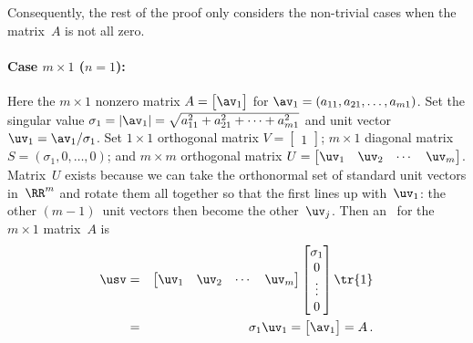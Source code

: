 Consequently, the rest of the proof only considers the non-trivial cases when the matrix~\(A\) is not all zero. 



\paragraph{Case $m\times 1$ ($n=1$):}
Here the \(m\times 1\) nonzero matrix \(A=\begin{bmatrix} \av_1 \end{bmatrix}\) for \(\av_1=(a_{11},a_{21},\ldots,a_{m1})\).
Set the singular value \(\sigma_1=|\av_1|=\sqrt{a_{11}^2+a_{21}^2+\cdots+a_{m1}^2}\) and unit vector \(\uv_1=\av_1/\sigma_1\).
Set \(1\times 1\) orthogonal matrix \(V=\begin{bmatrix} 1 \end{bmatrix}\);
\(m\times 1\) diagonal matrix 
\(S=(\sigma_1,0,\ldots,0)\); and
\(m\times m\) orthogonal matrix \(U=\begin{bmatrix} \uv_1 &\uv_2&\cdots&\uv_m\end{bmatrix}\).
Matrix~\(U\) exists because we can take the orthonormal set of standard unit vectors in~\(\RR^m\) and rotate them all together so that the first lines up with~\(\uv_1\): the other \((m-1)\)~unit vectors then become the other~\(\uv_j\).
Then an \svd\ for the \(m\times1\) matrix~\(A\) is
\begin{eqnarray*}
\usv
&=&\begin{bmatrix} \uv_1 &\uv_2&\cdots&\uv_m\end{bmatrix}
\begin{bmatrix} \sigma_1\\0\\\vdots\\0 \end{bmatrix}
\tr{1}
\\&=&\sigma_1{\uv_1}
=\begin{bmatrix} \av_1 \end{bmatrix}
=A\,.
\end{eqnarray*}


